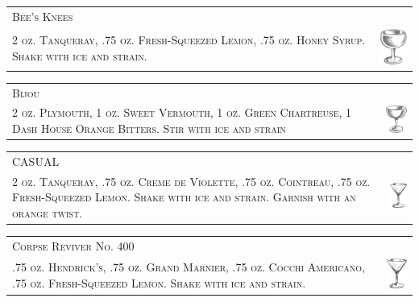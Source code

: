 \documentclass{article}
\begin{document}
\begin{tabular}{b{2.5in} m{0.625in}}
  \multicolumn{2}{p{3.5in}}{\centering\Huge\textsc{Bee's Knees}} \\ 
  \textsc{2 oz. Tanqueray, .75 oz. Fresh-Squeezed Lemon,
  .75 oz. Honey Syrup. Shake with ice and strain.} &
  \includegraphics[width=0.5in]{coupe.png}
\end{tabular}

\begin{tabular}{b{2.5in} m{0.625in}}
  \multicolumn{2}{p{3.5in}}{\centering\Huge\textsc{Bijou}} \\ 
  \textsc{2 oz. Plymouth, 1 oz. Sweet Vermouth, 1 oz. Green Chartreuse, 
  1 Dash House Orange Bitters. Stir with ice and strain} &
  \includegraphics[width=0.5in]{egg_coupe.png}
\end{tabular}

\begin{tabular}{b{2.5in} m{0.625in}}
  \multicolumn{2}{p{3.5in}}{\centering\Huge\textsc{CASUAL}} \\ 
  \textsc{2 oz. Tanqueray, .75 oz. Creme de Violette, .75 oz. Cointreau,
  .75 oz. Fresh-Squeezed Lemon. Shake with ice and strain.
  Garnish with an orange twist.} &
  \includegraphics[width=0.5in]{goblet.png}
\end{tabular}

\begin{tabular}{b{2.5in} m{0.625in}}
  \multicolumn{2}{p{3.5in}}{\centering\Huge\textsc{Corpse Reviver No. 400}} \\ 
  \textsc{.75 oz. Hendrick's, .75 oz. Grand Marnier, .75 oz. Cocchi Americano,
  .75 oz. Fresh-Squeezed Lemon. Shake with ice and strain.} &
  \includegraphics[width=0.5in]{goblet.png}
\end{tabular}
\end{document}

